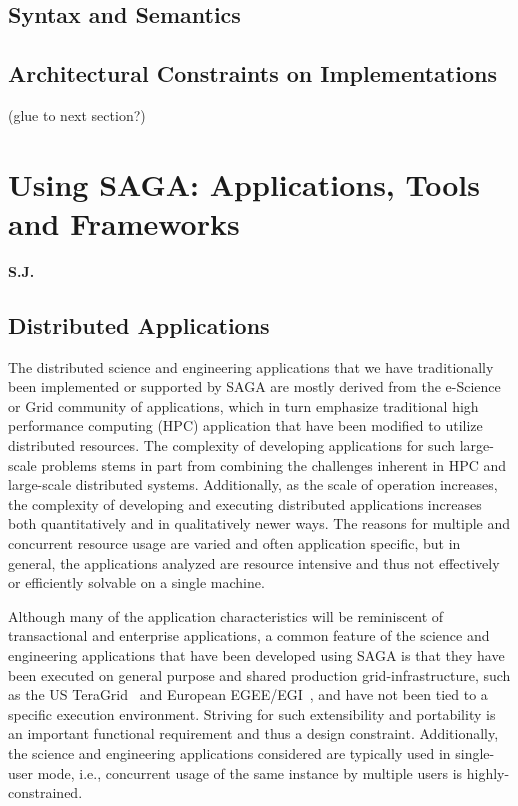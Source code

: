 \documentclass[a4paper,10pt]{article}
\begin{document}
 \subsection{Syntax and Semantics}


 \subsection{Architectural Constraints on Implementations}
   (glue to next section?)









\section{Using SAGA: Applications, Tools and Frameworks} \textbf{S.J.}

\subsection{Distributed Applications}

 The distributed science and engineering applications that we have
 traditionally been implemented or supported by SAGA are mostly
 derived from the e-Science or Grid community of applications, which
 in turn emphasize traditional high performance computing (HPC)
 application that have been modified to utilize distributed resources.
 The complexity of developing applications for such large-scale
 problems stems in part from combining the challenges inherent in HPC
 and large-scale distributed systems.  Additionally, as the scale of
 operation increases, the complexity of developing and executing
 distributed applications increases both quantitatively and in
 qualitatively newer ways.  The reasons for multiple and concurrent
 resource usage are varied and often application specific, but in
 general, the applications analyzed are resource intensive and thus
 not effectively or efficiently solvable on a single machine.

 Although many of the application characteristics will be reminiscent
 of transactional and enterprise applications, a common feature of the
 science and engineering applications that have been developed using
 SAGA is that they have been executed on general purpose and shared
 production grid-infrastructure, such as the US
 TeraGrid~\cite{teragrid} and European EGEE/EGI~\cite{egi}, and have
 not been tied to a specific execution environment. Striving for such
 extensibility and portability is an important functional requirement
 and thus a design constraint. Additionally, the science and
 engineering applications considered are typically used in single-user
 mode, i.e., concurrent usage of the same instance by multiple users
 is highly-constrained.
\end{document}

